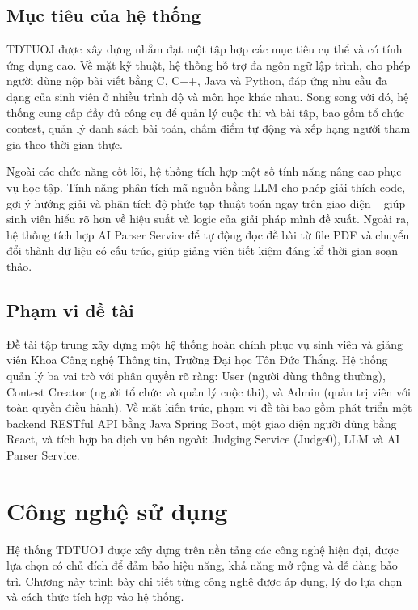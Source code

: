 \documentclass[12pt, a4paper]{report}
\begin{document}
\section{Mục tiêu của hệ thống}

TDTUOJ được xây dựng nhằm đạt một tập hợp các mục tiêu cụ thể và có tính ứng dụng cao. Về mặt kỹ thuật, hệ thống hỗ trợ đa ngôn ngữ lập trình, cho phép người dùng nộp bài viết bằng C, C++, Java và Python, đáp ứng nhu cầu đa dạng của sinh viên ở nhiều trình độ và môn học khác nhau. Song song với đó, hệ thống cung cấp đầy đủ công cụ để quản lý cuộc thi và bài tập, bao gồm tổ chức contest, quản lý danh sách bài toán, chấm điểm tự động và xếp hạng người tham gia theo thời gian thực.

Ngoài các chức năng cốt lõi, hệ thống tích hợp một số tính năng nâng cao phục vụ học tập. Tính năng phân tích mã nguồn bằng \ac{LLM} cho phép giải thích code, gợi ý hướng giải và phân tích độ phức tạp thuật toán ngay trên giao diện -- giúp sinh viên hiểu rõ hơn về hiệu suất và logic của giải pháp mình đề xuất. Ngoài ra, hệ thống tích hợp AI Parser Service để tự động đọc đề bài từ file \ac{PDF} và chuyển đổi thành dữ liệu có cấu trúc, giúp giảng viên tiết kiệm đáng kể thời gian soạn thảo.

\section{Phạm vi đề tài}

Đề tài tập trung xây dựng một hệ thống hoàn chỉnh phục vụ sinh viên và giảng viên Khoa Công nghệ Thông tin, Trường Đại học Tôn Đức Thắng. Hệ thống quản lý ba vai trò với phân quyền rõ ràng: User (người dùng thông thường), Contest Creator (người tổ chức và quản lý cuộc thi), và Admin (quản trị viên với toàn quyền điều hành). Về mặt kiến trúc, phạm vi đề tài bao gồm phát triển một backend \ac{REST}ful \ac{API} bằng Java Spring Boot, một giao diện người dùng bằng React, và tích hợp ba dịch vụ bên ngoài: Judging Service (Judge0), \ac{LLM} và AI Parser Service.

\chapter{Công nghệ sử dụng}

Hệ thống TDTUOJ được xây dựng trên nền tảng các công nghệ hiện đại, được lựa chọn có chủ đích để đảm bảo hiệu năng, khả năng mở rộng và dễ dàng bảo trì. Chương này trình bày chi tiết từng công nghệ được áp dụng, lý do lựa chọn và cách thức tích hợp vào hệ thống.
\end{document}
